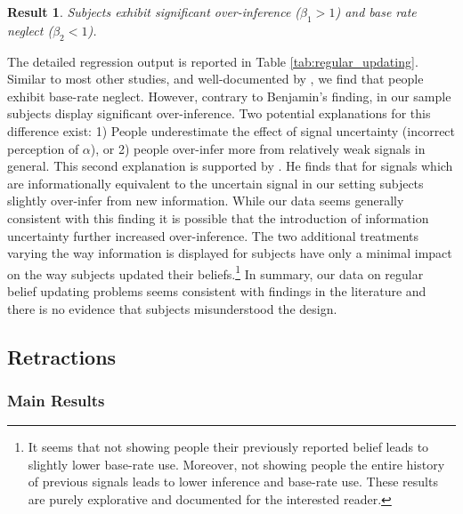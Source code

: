 \documentclass{article}
\newtheorem{result}{Result}
\newenvironment{Result}{\begin{result} \rm }{\end{result}}
\begin{document}
\begin{Result}
Subjects exhibit significant over-inference ($\beta_1>1$) and base rate neglect ($\beta_2<1$).
\end{Result}

The detailed regression output is reported in Table \ref{tab:regular_updating}. Similar to most other studies, and well-documented by \cite{Benjamin2019}, we find that people exhibit base-rate neglect. However, contrary to Benjamin's finding, in our sample subjects display significant over-inference. Two potential explanations for this difference exist: 1) People underestimate the effect of signal uncertainty (incorrect perception of $\alpha$), or 2) people over-infer more from relatively weak signals in general. This second explanation is supported by \cite{Thaler2021}. He finds that for signals which are informationally equivalent to the uncertain signal in our setting subjects slightly over-infer from new information. While our data seems generally consistent with this finding it is possible that the introduction of information uncertainty further increased over-inference. The two additional treatments varying the way information is displayed for subjects have only a minimal impact on the way subjects updated their beliefs.\footnote{It seems that not showing people their previously reported belief leads to slightly lower base-rate use. Moreover, not showing people the entire history of previous signals leads to lower inference and base-rate use. These results are purely explorative and documented for the interested reader.} In summary, our data on regular belief updating problems seems consistent with findings in the literature and there is no evidence that subjects misunderstood the design.


\subsection{Retractions}

\subsubsection{Main Results}
\end{document}
